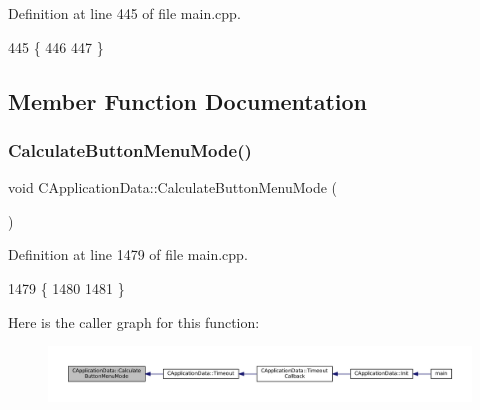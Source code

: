 Definition at line 445 of file main.\+cpp.


\begin{DoxyCode}
445                                    \{
446     
447 \}
\end{DoxyCode}


\subsection{Member Function Documentation}
\hypertarget{classCApplicationData_a5654dc28e14fa5bbc9ceb630d5259f91}{}\label{classCApplicationData_a5654dc28e14fa5bbc9ceb630d5259f91} 
\subsubsection{\texorpdfstring{Calculate\+Button\+Menu\+Mode()}{CalculateButtonMenuMode()}}
{\footnotesize\ttfamily void C\+Application\+Data\+::\+Calculate\+Button\+Menu\+Mode (\begin{DoxyParamCaption}{ }\end{DoxyParamCaption})\hspace{0.3cm}{\ttfamily [protected]}}



Definition at line 1479 of file main.\+cpp.


\begin{DoxyCode}
1479                                               \{
1480 
1481 \}
\end{DoxyCode}
Here is the caller graph for this function\+:\nopagebreak
\begin{figure}[H]
\begin{center}
\leavevmode
\includegraphics[width=350pt]{classCApplicationData_a5654dc28e14fa5bbc9ceb630d5259f91_icgraph}
\end{center}
\end{figure}
\hypertarget{classCApplicationData_a9fa1176cd629742424f29ab20c212142}{}\label{classCApplicationData_a9fa1176cd629742424f29ab20c212142} 
